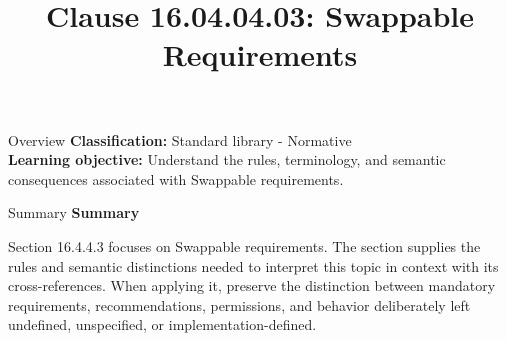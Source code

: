 \documentclass[10pt,letterpaper]{article}
\title{Clause 16.04.04.03: Swappable Requirements}
\author{}
\date{}
\begin{document}
\maketitle
\begin{CornellOverviewBox}{Overview}
\textbf{Classification:} Standard library - Normative\\[2pt]
\textbf{Learning objective:} Understand the rules, terminology, and semantic consequences associated with Swappable requirements.
\end{CornellOverviewBox}\begin{CornellSummaryBox}{Summary}
{\sffamily\bfseries\color{Accent} Summary}\par\vspace{3pt}Section 16.4.4.3 focuses on Swappable requirements. The section supplies the rules and semantic distinctions needed to interpret this topic in context with its cross-references. When applying it, preserve the distinction between mandatory requirements, recommendations, permissions, and behavior deliberately left undefined, unspecified, or implementation-defined.
\end{CornellSummaryBox}
\end{document}
